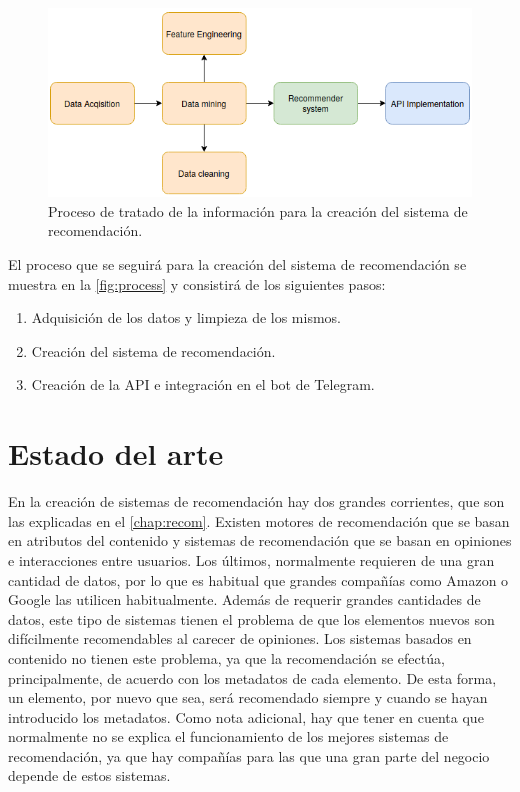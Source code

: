 \begin{figure}[h]
    \centering
    \captionsetup{width=10cm}
    \includegraphics[width=12cm]{contenido/imagenes/initial.png}
    \caption{Proceso de tratado de la información para la creación del sistema de recomendación.}
    \label{fig:process}
\end{figure}

El proceso que se seguirá para la creación del sistema de recomendación se muestra en la \autoref{fig:process} y consistirá de los siguientes pasos:
\begin{enumerate}
    \item Adquisición de los datos y limpieza de los mismos.
    \item Creación del sistema de recomendación.
    \item Creación de la API e integración en el bot de Telegram.
\end{enumerate}


\section{Estado del arte}\label{sec:soa}

En la creación de sistemas de recomendación hay dos grandes corrientes, que son las explicadas en el \autoref{chap:recom}. Existen motores de recomendación que se basan en atributos del contenido y sistemas de recomendación que se basan en opiniones e interacciones entre usuarios. Los últimos, normalmente requieren de una gran cantidad de datos, por lo que es habitual que grandes compañías como Amazon \cite{Amazon} o Google \cite{Google} las utilicen habitualmente. Además de requerir grandes cantidades de datos, este tipo de sistemas tienen el problema de que los elementos nuevos son difícilmente recomendables al carecer de opiniones. Los sistemas basados en contenido no tienen este problema, ya que la recomendación se efectúa, principalmente, de acuerdo con los metadatos de cada elemento. De esta forma, un elemento, por nuevo que sea, será recomendado siempre y cuando se hayan introducido los metadatos. Como nota adicional, hay que tener en cuenta que normalmente no se explica el funcionamiento de los mejores sistemas de recomendación, ya que hay compañías para las que una gran parte del negocio depende de estos sistemas.\\

